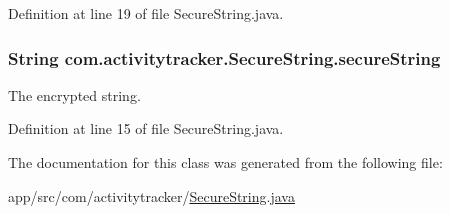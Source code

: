 Definition at line 19 of file Secure\+String.\+java.

\subsubsection[{\texorpdfstring{secure\+String}{secureString}}]{\setlength{\rightskip}{0pt plus 5cm}String com.\+activitytracker.\+Secure\+String.\+secure\+String\hspace{0.3cm}{\ttfamily [private]}}\hypertarget{classcom_1_1activitytracker_1_1_secure_string_a1448f7b8865c6c57cc7218662ee7f1ee}{}\label{classcom_1_1activitytracker_1_1_secure_string_a1448f7b8865c6c57cc7218662ee7f1ee}
The encrypted string. 

Definition at line 15 of file Secure\+String.\+java.



The documentation for this class was generated from the following file\+:\begin{DoxyCompactItemize}
\item 
app/src/com/activitytracker/\hyperlink{_secure_string_8java}{Secure\+String.\+java}\end{DoxyCompactItemize}
